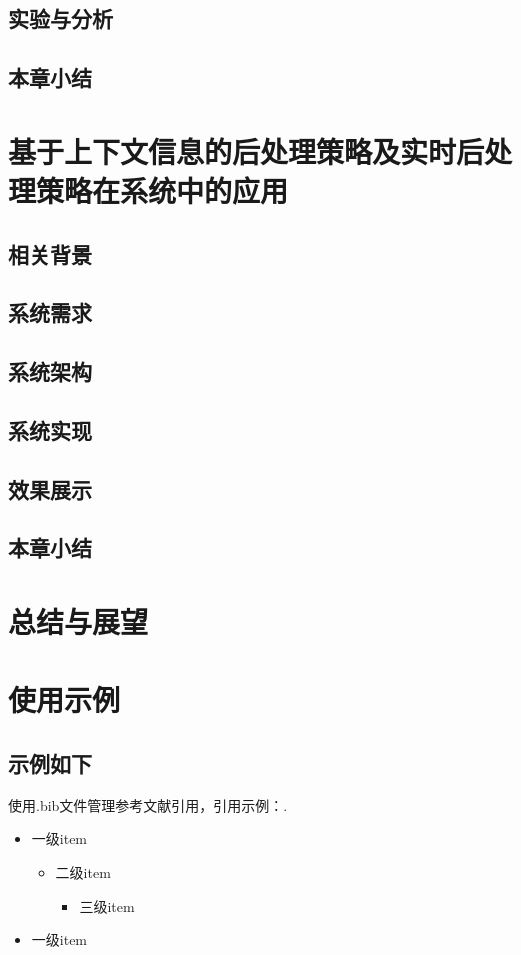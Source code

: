 \documentclass[winfonts,master,twoside,AutoFakeBold= {2}]{njuthesis}
\begin{document}
\section{实验与分析}
\section{本章小结}


\chapter{基于上下文信息的后处理策略及实时后处理策略在系统中的应用}
\section{相关背景}
\section{系统需求}
\section{系统架构}
\section{系统实现}
\section{效果展示}
\section{本章小结}

\chapter{总结与展望}

\chapter{使用示例}
\section{示例如下}
使用.bib文件管理参考文献引用，引用示例：\cite{BHR12}.\par
\begin{itemize}
\item 一级item
 \begin{itemize}
 \item 二级item
	\begin{itemize}
	\item 三级item

	\end{itemize}

 \end{itemize}
\item 一级item

\end{itemize}
\end{document}
